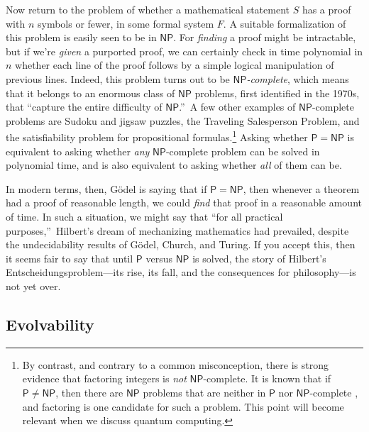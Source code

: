 \documentclass[12pt,onecolumn]{article}%
\begin{document}
Now return to the problem of whether a mathematical statement $S$ has a proof
with $n$ symbols or fewer, in some formal system $F$. A suitable
formalization of this problem is easily seen to be in $\mathsf{NP}$. For
\textit{finding} a proof might be intractable, but if we're \textit{given} a
purported proof, we can certainly check in time polynomial in $n$ whether each
line of the proof follows by a simple logical manipulation of previous lines.
 Indeed, this problem turns out to be $\mathsf{NP}$\textit{-complete}, which
means that it belongs to an enormous class of $\mathsf{NP}$ problems, first
identified in the 1970s, that \textquotedblleft capture the entire difficulty
of $\mathsf{NP}$.\textquotedblright\  A few other examples of $\mathsf{NP}%
$-complete problems are Sudoku and jigsaw puzzles, the Traveling Salesperson
Problem, and the satisfiability problem for propositional
formulas.\footnote{\label{FACTOR}By contrast, and contrary to a common
misconception, there is strong evidence that factoring integers is
\textit{not} $\mathsf{NP}$-complete. It is known that if $\mathsf{P}%
\neq\mathsf{NP}$, then there are $\mathsf{NP}$ problems that are neither in
$\mathsf{P}$ nor $\mathsf{NP}$-complete \cite{ladner}, and factoring is one
candidate for such a problem. This point will become relevant when we
discuss quantum computing.} Asking whether $\mathsf{P}=\mathsf{NP}$ is
equivalent to asking whether \textit{any} $\mathsf{NP}$-complete problem can
be solved in polynomial time, and is also equivalent to asking whether
\textit{all} of them can be.

In modern terms, then, G\"{o}del is saying that if $\mathsf{P}=\mathsf{NP}$,
then whenever a theorem had a proof of reasonable length, we could
\textit{find} that proof in a reasonable amount of time. In such a
situation, we might say that \textquotedblleft for all practical
purposes,\textquotedblright\  Hilbert's dream of mechanizing mathematics had
prevailed, despite the undecidability results of G\"{o}del, Church, and
Turing. If you accept this, then it seems fair to say that until
$\mathsf{P}$ versus $\mathsf{NP}$ is solved, the story of Hilbert's
Entscheidungsproblem---its rise, its fall, and the consequences for
philosophy---is not yet over.

\subsection{Evolvability\label{EVOL}}
\end{document}
